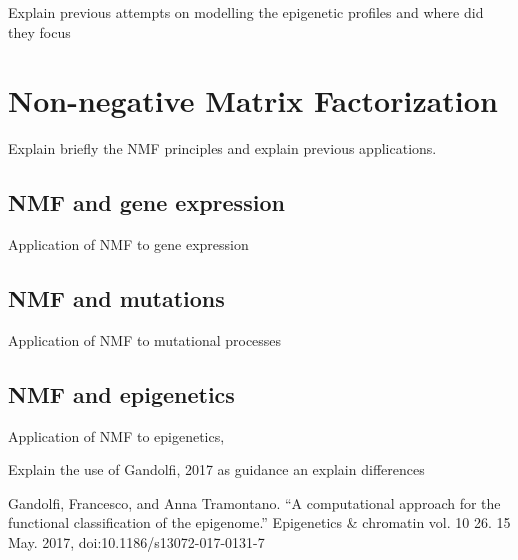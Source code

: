 Explain previous attempts on modelling the epigenetic profiles and where did they focus

\section{Non-negative Matrix Factorization}

Explain briefly the NMF principles and explain previous applications.

\subsection{NMF and gene expression}

Application of NMF to gene expression

\subsection{NMF and mutations}

Application of NMF to mutational processes

\subsection{NMF and epigenetics}

Application of NMF to epigenetics,

Explain the use of Gandolfi, 2017 as guidance an explain differences

Gandolfi, Francesco, and Anna Tramontano. ``A computational approach for the functional classification of the epigenome.'' Epigenetics \& chromatin vol. 10 26. 15 May. 2017, doi:10.1186/s13072-017-0131-7
